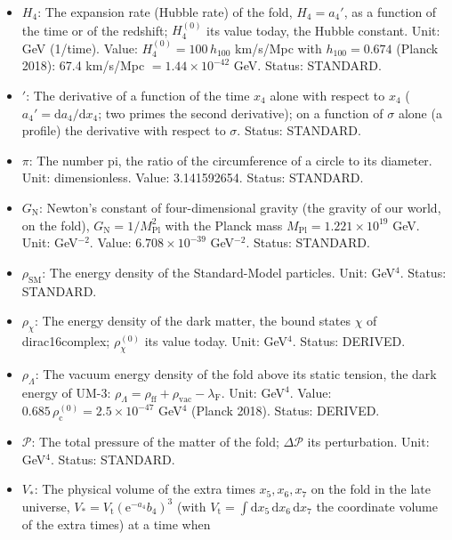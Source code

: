 \documentclass[
  10pt,
]{article}
\providecommand{\tightlist}{%
  \setlength{\itemsep}{0pt}\setlength{\parskip}{0pt}}
\begin{document}
\begin{itemize}
\tightlist
\item
  \(H_4\): The expansion rate (Hubble rate) of the fold, \(H_4 = a_4'\),
  as a function of the time or of the redshift; \(H_4^{(0)}\) its value
  today, the Hubble constant. Unit: GeV (1/time). Value:
  \(H_4^{(0)} = 100\,h_{100}\) km/s/Mpc with \(h_{100} = 0.674\) (Planck
  2018): 67.4 km/s/Mpc \(= 1.44\times10^{-42}\) GeV. Status: STANDARD.
\item
  \({}'\): The derivative of a function of the time \(x_4\) alone with
  respect to \(x_4\) (\(a_4' = \mathrm{d}a_4/\mathrm{d}x_4\); two primes
  the second derivative); on a function of \(\sigma\) alone (a profile)
  the derivative with respect to \(\sigma\). Status: STANDARD.
\item
  \(\pi\): The number pi, the ratio of the circumference of a circle to
  its diameter. Unit: dimensionless. Value: 3.141592654. Status:
  STANDARD.
\item
  \(G_{\mathrm{N}}\): Newton's constant of four-dimensional gravity (the
  gravity of our world, on the fold),
  \(G_{\mathrm{N}} = 1/M_{\mathrm{Pl}}^2\) with the Planck mass
  \(M_{\mathrm{Pl}} = 1.221\times10^{19}\) GeV. Unit: GeV\(^{-2}\).
  Value: \(6.708\times10^{-39}\) GeV\(^{-2}\). Status: STANDARD.
\item
  \(\rho_{\mathrm{SM}}\): The energy density of the Standard-Model
  particles. Unit: GeV\(^4\). Status: STANDARD.
\item
  \(\rho_\chi\): The energy density of the dark matter, the bound states
  \(\chi\) of dirac16complex; \(\rho_\chi^{(0)}\) its value today. Unit:
  GeV\(^4\). Status: DERIVED.
\item
  \(\rho_\Lambda\): The vacuum energy density of the fold above its
  static tension, the dark energy of UM-3:
  \(\rho_\Lambda = \rho_{\mathrm{ff}} + \rho_{\mathrm{vac}} - \lambda_{\mathrm{F}}\).
  Unit: GeV\(^4\). Value:
  \(0.685\,\rho_{\mathrm{c}}^{(0)} = 2.5\times10^{-47}\) GeV\(^4\)
  (Planck 2018). Status: DERIVED.
\item
  \(\mathcal{P}\): The total pressure of the matter of the fold;
  \(\Delta\mathcal{P}\) its perturbation. Unit: GeV\(^4\). Status:
  STANDARD.
\item
  \(V_*\): The physical volume of the extra times \(x_5, x_6, x_7\) on
  the fold in the late universe,
  \(V_* = V_{\mathrm{t}}(\mathrm{e}^{-a_4}b_4)^3\) (with
  \(V_{\mathrm{t}} = \int\mathrm{d}x_5\,\mathrm{d}x_6\,\mathrm{d}x_7\)
  the coordinate volume of the extra times) at a time when

\end{itemize}
\end{document}
